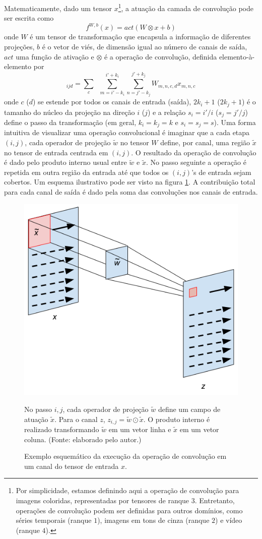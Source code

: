 Matematicamente, dado um tensor $x$\footnote{Por simplicidade, estamos definindo aqui a operação de convolução para imagens coloridas, representadas por tensores de ranque $3$. Entretanto, operações de convolução podem ser definidas para outros domínios, como séries temporais (ranque $1$), imagens em tons de cinza (ranque $2$) e vídeo (ranque $4$).}, a atuação da camada de convolução pode ser escrita como
\begin{equation}
f^{W,b}(x) = act(W \otimes x + b)
\end{equation}
onde $W$ é um tensor de transformação que encapsula a informação de diferentes projeções, $b$ é o vetor de viés, de dimensão igual ao número de canais de saída, $act$ uma função de ativação e $\otimes$ é a operação de convolução, definida elemento-à-elemento por
\begin{equation}
[W \otimes x]_{ijd} = \sum_{c} \;\; \sum_{m=i'-k_i}^{i'+ k_i} \sum_{n=j'-k_j}^{j'+k_j} W_{m, n, c, d} x_{m, n, c}
\end{equation}
onde $c$ ($d$) se estende por todos os canais de entrada (saída), $2k_i+1$ ($2k_j+1$) é o tamanho do núcleo da projeção na direção $i$ ($j$) e a relação $s_i = i'/i$ ($s_j = j'/j$) define o passo da transformação (em geral, $k_i = k_j = k$ e $s_i = s_j = s$). Uma forma intuitiva de visualizar uma operação convolucional é imaginar que a cada etapa $(i,j)$, cada operador de projeção $\tilde{w}$ no tensor $W$ define, por canal, uma região $\tilde{x}$ no tensor de entrada centrada em $(i,j)$. O resultado da operação de convolução é dado pelo produto interno usual entre $\tilde{w}$ e $\tilde{x}$. No passo seguinte a operação é repetida em outra região da entrada até que todos os $(i,j)$'s de entrada sejam cobertos. Um esquema ilustrativo pode ser visto na figura \ref{convw}. A contribuição total para cada canal de saída é dado pela soma das convoluções nos canais de entrada. 

\begin{figure}[ht]
	\caption{Exemplo esquemático da execução da operação de convolução em um canal do tensor de entrada $x$.}
	\begin{center}
	\includegraphics[width=.6\linewidth]{figuras/convwa.png}
	\end{center}
	\small No passo $i,j$, cada operador de projeção $\tilde{w}$ define um campo de atuação $\tilde{x}$. Para o canal $z$, $z_{i,j} = \tilde{w} \odot \tilde{x}$. O produto interno é realizado transformando $\tilde{w}$ em um vetor linha e $\tilde{x}$ em um vetor coluna. (Fonte: elaborado pelo autor.)
	\label{convw}
\end{figure}

